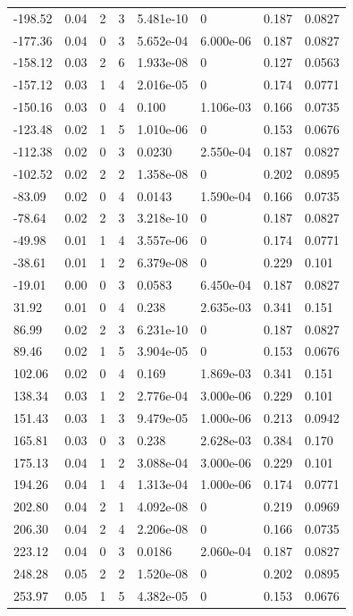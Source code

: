 \documentclass[preview]{standalone}
\begin{document}
{{\begin{tabular}{L{1.2cm}C{1.2cm} C{0.3cm}C{0.5cm} C{1.4cm}C{1.4cm} C{1.4cm}C{1.4cm}}
  -198.52  &  0.04  & 2     &  3 &  5.481e-10  & 0  & 0.187 &  0.0827   \\ 
  -177.36  &  0.04  & 0     &  3 &  5.652e-04  & 6.000e-06  & 0.187 &  0.0827   \\ 
  -158.12  &  0.03  & 2     &  6 &  1.933e-08  & 0  & 0.127 &  0.0563   \\ 
  -157.12  &  0.03  & 1     &  4 &  2.016e-05  & 0  & 0.174 &  0.0771   \\ 
  -150.16  &  0.03  & 0     &  4 &  0.100  & 1.106e-03  & 0.166 &  0.0735   \\ 
  -123.48  &  0.02  & 1     &  5 &  1.010e-06  & 0  & 0.153 &  0.0676   \\ 
  -112.38  &  0.02  & 0     &  3 &  0.0230  & 2.550e-04  & 0.187 &  0.0827   \\ 
  -102.52  &  0.02  & 2     &  2 &  1.358e-08  & 0  & 0.202 &  0.0895   \\ 
  -83.09  &  0.02  & 0     &  4 &  0.0143  & 1.590e-04  & 0.166 &  0.0735   \\ 
  -78.64  &  0.02  & 2     &  3 &  3.218e-10  & 0  & 0.187 &  0.0827   \\ 
  -49.98  &  0.01  & 1     &  4 &  3.557e-06  & 0  & 0.174 &  0.0771   \\ 
  -38.61  &  0.01  & 1     &  2 &  6.379e-08  & 0  & 0.229 &  0.101   \\ 
  -19.01  &  0.00  & 0     &  3 &  0.0583  & 6.450e-04  & 0.187 &  0.0827   \\ 
  31.92  &  0.01  & 0     &  4 &  0.238  & 2.635e-03  & 0.341 &  0.151   \\ 
  86.99  &  0.02  & 2     &  3 &  6.231e-10  & 0  & 0.187 &  0.0827   \\ 
  89.46  &  0.02  & 1     &  5 &  3.904e-05  & 0  & 0.153 &  0.0676   \\ 
  102.06  &  0.02  & 0     &  4 &  0.169  & 1.869e-03  & 0.341 &  0.151   \\ 
  138.34  &  0.03  & 1     &  2 &  2.776e-04  & 3.000e-06  & 0.229 &  0.101   \\ 
  151.43  &  0.03  & 1     &  3 &  9.479e-05  & 1.000e-06  & 0.213 &  0.0942   \\ 
  165.81  &  0.03  & 0     &  3 &  0.238  & 2.628e-03  & 0.384 &  0.170   \\ 
  175.13  &  0.04  & 1     &  2 &  3.088e-04  & 3.000e-06  & 0.229 &  0.101   \\ 
  194.26  &  0.04  & 1     &  4 &  1.313e-04  & 1.000e-06  & 0.174 &  0.0771   \\ 
  202.80  &  0.04  & 2     &  1 &  4.092e-08  & 0  & 0.219 &  0.0969   \\ 
  206.30  &  0.04  & 2     &  4 &  2.206e-08  & 0  & 0.166 &  0.0735   \\ 
  223.12  &  0.04  & 0     &  3 &  0.0186  & 2.060e-04  & 0.187 &  0.0827   \\ 
  248.28  &  0.05  & 2     &  2 &  1.520e-08  & 0  & 0.202 &  0.0895   \\ 
  253.97  &  0.05  & 1     &  5 &  4.382e-05  & 0  & 0.153 &  0.0676   \\ 
\hline 
\end{tabular} 

}}
\end{document}
